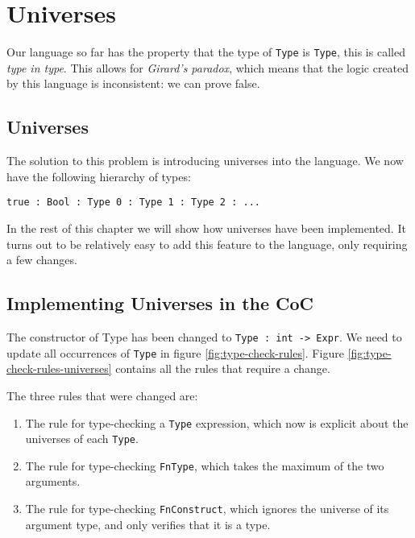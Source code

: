 \chapter{Universes}
\label{ch:universes}

Our language so far has the property that the type of \verb|Type| is \verb|Type|, this is called \emph{type in type}. This allows for \emph{Girard's paradox}, which means that the logic created by this language is inconsistent: we can prove false. 

\section{Universes}

The solution to this problem is introducing universes into the language. We now have the following hierarchy of types:
\begin{lstlisting}
true : Bool : Type 0 : Type 1 : Type 2 : ...
\end{lstlisting}

In the rest of this chapter we will show how universes have been implemented. It turns out to be relatively easy to add this feature to the language, only requiring a few changes.

\section{Implementing Universes in the CoC}

The constructor of Type has been changed to \verb|Type : int -> Expr|. We need to update all occurrences of \verb|Type| in figure \ref{fig:type-check-rules}. Figure \ref{fig:type-check-rules-universes} contains all the rules that require a change.

The three rules that were changed are:
\begin{enumerate}
	\item The rule for type-checking a \verb|Type| expression, which now is explicit about the universes of each \verb|Type|.
	\item The rule for type-checking \verb|FnType|, which takes the maximum of the two arguments.
	\item The rule for type-checking \verb|FnConstruct|, which ignores the universe of its argument type, and only verifies that it is a type.
\end{enumerate}

